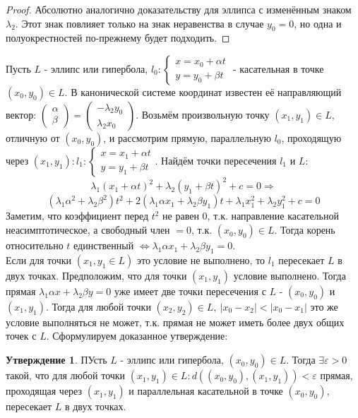 \documentclass[a4paper, 12pt]{article}
\renewcommand{\epsilon}{\varepsilon}
\theoremstyle{definition}
\newtheorem*{subtheorem}{Утверждение}
\begin{document}
	\begin{proof}
		Абсолютно аналогично доказательству для эллипса с изменённым знаком $\lambda_2$.
		Этот знак повлияет только на знак неравенства в случае $y_0 = 0$, но одна и полуокрестностей по-прежнему будет подходить.
	\end{proof}
	
	Пусть $L$ - эллипс или гипербола, $l_0: \begin{cases}
	x = x_0 + \alpha t\\
	y = y_0 + \beta t
	\end{cases}$ - касательная в точке $(x_0, y_0)\in L$. В канонической системе координат известен её направляющий вектор: $\begin{pmatrix} \alpha \\ \beta \end{pmatrix} = \begin{pmatrix} -\lambda_2y_0 \\ \lambda_2x_0 \end{pmatrix}$. Возьмём произвольную точку $(x_1, y_1)\in L$, отличную от $(x_0, y_0)$, и рассмотрим прямую, параллельную $l_0$, проходящую через $(x_1, y_1): l_1: \begin{cases}
	x = x_1 + \alpha t\\
	y = y_1 + \beta t
	\end{cases}$. Найдём точки пересечения $l_1$ и $L$:
	$$\lambda_1(x_1+\alpha t)^2+\lambda_2(y_1+\beta t)^2+c = 0 \Rightarrow$$ $$(\lambda_1\alpha^2 + \lambda_2\beta^2)t^2 + 2(\lambda_1\alpha x_1 + \lambda_2\beta y_1)t + \lambda_1x_1^2 + \lambda_2y_1^2 + c = 0$$
	Заметим, что коэффициент перед $t^2$ не равен 0, т.к. направление касательной неасимптотическое, а свободный член $= 0$, т.к. $(x_0, y_0)\in L$. Тогда корень относительно $t$ единственный $\Leftrightarrow \lambda_1\alpha x_1 + \lambda_2\beta y_1 = 0$.\\
	Если для точки $(x_1, y_1 \in L)$ это условие не выполнено, то $l_1$ пересекает $L$ в двух точках.
	Предположим, что для точки $(x_1, y_1)$ условие выполнено. Тогда прямая $\lambda_1\alpha x + \lambda_2\beta y = 0$ уже имеет две точки пересечения с $L$ - $(x_0, y_0)$ и $(x_1, y_1)$. Тогда для любой точки $(x_2, y_2) \in L, \ |x_0 - x_2| < |x_0 - x_1|$ это же условие выполняться не может, т.к. прямая не может иметь более двух общих точек с $L$. Сформулируем доказанное утверждение:
	\begin{subtheorem}
		ПУсть $L$ - эллипс или гипербола, $(x_0, y_0)\in L$. Тогда $\exists \epsilon > 0$ такой, что для любой точки $(x_1, y_1) \in L: d((x_0, y_0), (x_1, y_1)) < \epsilon$ прямая, проходящая через $(x_1, y_1)$ и параллельная касательной в точке $(x_0, y_0)$, пересекает $L$ в двух точках.
	\end{subtheorem} 
\end{document}
